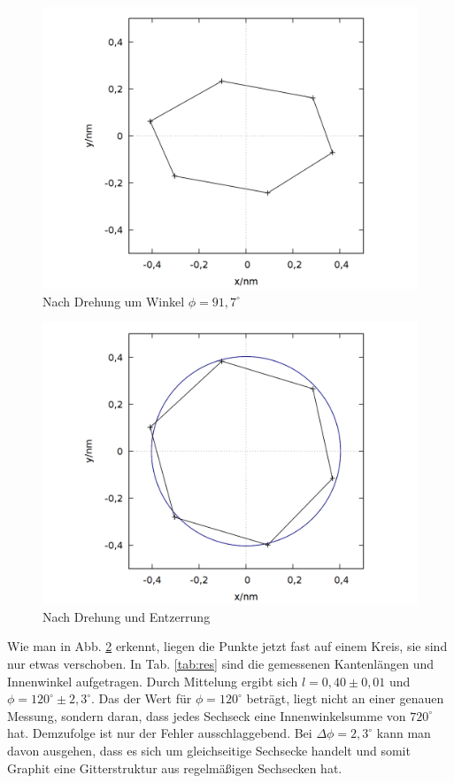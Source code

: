\begin{figure}
\centering
\includegraphics[scale=0.3]{data/graphit/out_rotate_old.png}
\caption{Nach Drehung um Winkel $\phi = 91,7^\circ$}
\label{fig:fit1}
\end{figure}

\begin{figure}
\centering
\includegraphics[scale=0.3]{data/graphit/out_rotate.png}
\caption{Nach Drehung und Entzerrung}
\label{fig:fit2}
\end{figure}

Wie man in Abb. \ref{fig:fit2} erkennt, liegen die Punkte jetzt fast auf einem Kreis, sie sind nur etwas verschoben. In Tab. \ref{tab:res} sind die gemessenen Kantenlängen und Innenwinkel aufgetragen. Durch Mittelung ergibt sich $l = 0,40 \pm 0,01$ und $\phi = 120^\circ \pm 2,3^\circ$. Das der Wert für $\phi = 120^\circ$ beträgt, liegt nicht an einer genauen Messung, sondern daran, dass jedes Sechseck eine Innenwinkelsumme von $720^\circ$ hat. Demzufolge ist nur der Fehler ausschlaggebend. Bei $\Delta\phi=2,3^\circ$ kann man davon ausgehen, dass es sich um gleichseitige Sechsecke handelt und somit Graphit eine Gitterstruktur aus regelmäßigen Sechsecken hat.\\

